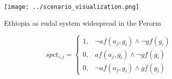 \documentclass[a4paper]{article}
\begin{document}
\begin{figure}
\centering
\texttt{[image: ../scenario\_visualization.png]}
\caption{Ethiopia as eudal system widespread in the Perorm
}
\end{figure}
 
\begin{equation}
spct_{i,j} =
\begin{cases}
1, & \text{$\neg af(a_j,g_i) \wedge \neg gf(g_i)$}\\
0, & \text{$af(a_j,g_i) \wedge \neg gf(g_i)$}\\
0, & \text{$\neg af(a_j,g_i) \wedge gf(g_i)$}
\end{cases}
\end{equation}
\end{document}

